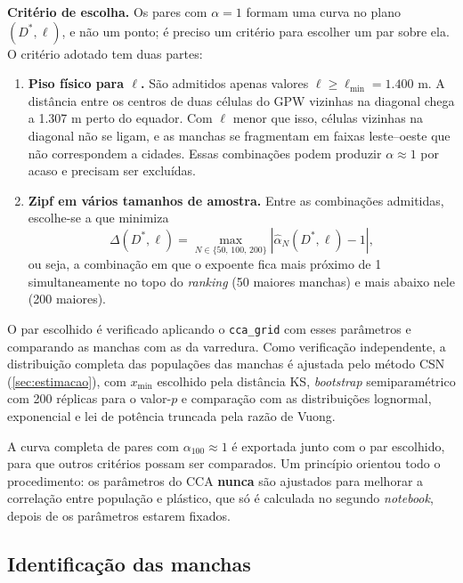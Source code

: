 \textbf{Critério de escolha.} Os pares com $\alpha = 1$ formam uma curva no plano $(D^{*}, \ell)$, e não um ponto; é preciso um critério para escolher um par sobre ela. O critério adotado tem duas partes:

\begin{enumerate}
	\item \textbf{Piso físico para $\ell$.} São admitidos apenas valores $\ell \geq \ell_{\min} = 1.400$ m. A distância entre os centros de duas células do GPW vizinhas na diagonal chega a 1.307 m perto do equador. Com $\ell$ menor que isso, células vizinhas na diagonal não se ligam, e as manchas se fragmentam em faixas leste--oeste que não correspondem a cidades. Essas combinações podem produzir $\alpha \approx 1$ por acaso e precisam ser excluídas.
	\item \textbf{Zipf em vários tamanhos de amostra.} Entre as combinações admitidas, escolhe-se a que minimiza
	\begin{equation}
		\Delta(D^{*}, \ell) = \max_{N \in \{50,\,100,\,200\}} \left| \hat{\alpha}_N(D^{*}, \ell) - 1 \right|,
		\label{eq:delta}
	\end{equation}
	ou seja, a combinação em que o expoente fica mais próximo de 1 simultaneamente no topo do \textit{ranking} (50 maiores manchas) e mais abaixo nele (200 maiores).
\end{enumerate}

O par escolhido é verificado aplicando o \texttt{cca\_grid} com esses parâmetros e comparando as manchas com as da varredura. Como verificação independente, a distribuição completa das populações das manchas é ajustada pelo método CSN (\autoref{sec:estimacao}), com $x_{\min}$ escolhido pela distância KS, \textit{bootstrap} semiparamétrico com 200 réplicas para o valor-$p$ e comparação com as distribuições lognormal, exponencial e lei de potência truncada pela razão de Vuong.

A curva completa de pares com $\alpha_{100} \approx 1$ é exportada junto com o par escolhido, para que outros critérios possam ser comparados. Um princípio orientou todo o procedimento: os parâmetros do CCA \textbf{nunca} são ajustados para melhorar a correlação entre população e plástico, que só é calculada no segundo \textit{notebook}, depois de os parâmetros estarem fixados.

\subsection{Identificação das manchas}


